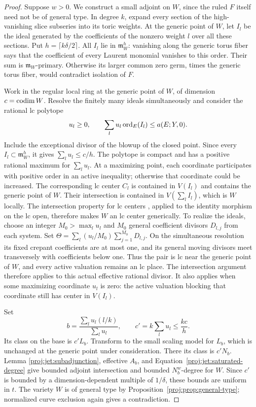 \begin{proof}
Suppose \(w>0\).  We construct a small adjoint on \(W\), since the
ruled \(F\) itself need not be of general type.  In degree \(k\),
expand every section of the high-vanishing slice subseries into
its toric weights.  At the generic point of \(W\), let \(I_l\) be
the ideal generated by the coefficients of the nonzero weight \(l\)
over all these sections.  Put \(h=\lceil k\delta/2\rceil\).
All \(I_l\) lie in \(\mathfrak m_W^h\): vanishing along the generic
torus fiber says that the coefficient of every Laurent monomial
vanishes to this order.  Their sum is
\(\mathfrak m_W\)-primary.  Otherwise its larger common zero germ,
times the generic torus fiber, would contradict isolation of \(F\).

Work in the regular local ring at the generic point of \(W\), of
dimension \(c=\operatorname{codim} W\).  Resolve the finitely many ideals
simultaneously and consider the rational lc polytope
\[
 u_l\ge0,\qquad
 \sum_lu_l\operatorname{ord}_E(I_l)\le a(E;Y,0).
\]
Include the exceptional divisor of the blowup of the closed point.
Since every \(I_l\subset\mathfrak m_W^h\), it gives
\(\sum_lu_l\le c/h\).  The polytope is compact and has a positive
rational maximum for \(\sum_lu_l\).  At a maximizing point, each
coordinate participates with positive order in an active
inequality; otherwise that coordinate could be increased.
The corresponding lc center \(C_l\) is contained in \(V(I_l)\)
and contains the generic point of \(W\).  Their intersection is
contained in \(V(\sum_l I_l)\), which is \(W\) locally.  The
intersection property for lc centers
\cite[Theorem~1.7]{Proj-KollarKovacs2010}, applied to the identity
morphism on the lc open, therefore makes \(W\) an lc center
generically.  To realize the ideals, choose an integer
\(M_0>\max_l u_l\) and \(M_0\) general coefficient divisors
\(D_{l,j}\) from each system.  Set
\(\Theta=\sum_l(u_l/M_0)\sum_{j=1}^{M_0}D_{l,j}\).
On the simultaneous resolution its fixed crepant coefficients are
at most one, and its general moving divisors meet transversely
with coefficients below one.  Thus the pair is lc near the generic
point of \(W\), and every active valuation remains an lc place.
The intersection argument therefore applies to this actual
effective rational divisor.  It also applies when some maximizing
coordinate \(u_l\) is zero: the active valuation blocking that
coordinate still has center in \(V(I_l)\).

Set
\[
 b=\frac{\sum_lu_l(l/k)}{\sum_lu_l},
 \qquad c'=k\sum_lu_l\le\frac{kc}{h}.
\]
Its class on the base is \(c'L_b\).  Transform to the small scaling
model for \(L_b\), which is unchanged at the generic point under
consideration.  There its class is \(c'N_b\).  Lemma
\ref{proj:jet:subadjunction}, effective \(A_b\), and
Equation~\eqref{proj:jet:saturated-degree} give bounded adjoint
intersection and bounded \(N_b^w\)-degree for \(W\).
Since \(c'\) is bounded by a dimension-dependent multiple of
\(1/\delta\), these bounds are uniform in \(t\).
The variety \(W\) is of general type by
Proposition~\ref{proj:prop:general-type}; normalized curve exclusion
again gives a contradiction.


\end{proof}
